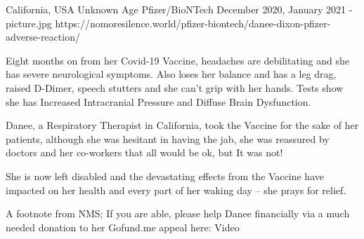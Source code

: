 {California, USA}
{Unknown Age}
{Pfizer/BioNTech}
{December 2020, January 2021}
{-}
{picture.jpg}
{https://nomoresilence.world/pfizer-biontech/danee-dixon-pfizer-adverse-reaction/}
{


Eight months on from her Covid-19 Vaccine, headaches are debilitating and she has severe neurological symptoms. Also loses her balance and has a leg drag, raised D-Dimer, speech stutters and she can’t grip with her hands.
Tests show she has Increased Intracranial Pressure and Diffuse Brain Dysfunction.

Danee, a Respiratory Therapist in California, took the Vaccine for the sake of her patients, although she was hesitant in having the jab, she was reassured by doctors and her co-workers that all would be ok, but It was not!

She is now left disabled and the devastating effects from the Vaccine have impacted on her health and every part of her waking day – she prays for relief.

A footnote from NMS;
If you are able, please help Danee financially via a much needed donation to
her Gofund.me appeal here:
Video
}
